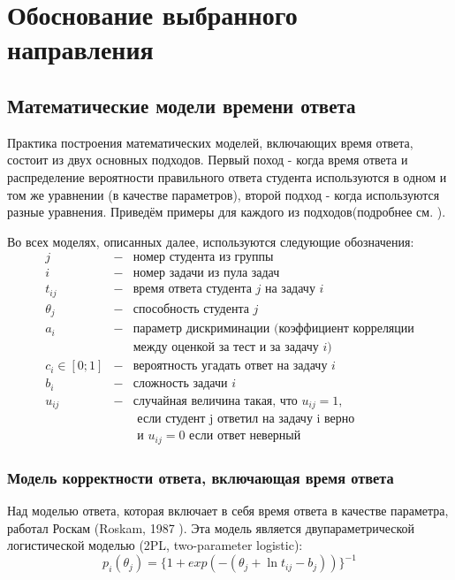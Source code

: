 \section{Обоснование выбранного направления}
\label{ch22}
\subsection{Математические модели времени ответа}

Практика построения математических моделей, включающих время от\-вета, состоит из двух основных подходов. Первый поход - когда время ответа и распределение вероятности правильного ответа студента используются в одном и том же уравнении (в качестве параметров), второй подход - когда используются разные урав\-нения. Приведём примеры для каждого из под\-ходов(подробнее см. \cite{8.}).

Во всех моделях, описанных далее, используются следующие обозначения:
$$
\begin{array}{lll}
j &-& \mbox{номер студента из группы}\\
i &-& \mbox{номер задачи из пула задач}\\
t_{ij} &-& \mbox{время ответа студента } j \mbox{ на задачу } i\\
\theta_j &-& \mbox{способность студента }j\\
a_i &-& \mbox{параметр дискриминации (коэффициент корреляции}\\
 & & \mbox{между оценкой за тест и за задачу } i)\\
c_i \in [0;1] &-& \mbox{вероятность угадать ответ на задачу } i\\
b_i &-& \mbox{сложность задачи } i\\
u_{ij} &-& \mbox{случайная величина такая, что } u_{ij} = 1, \\  
& &\mbox{ если студент  j  ответил на задачу i верно} \\
& &\mbox{ и }u_{ij} =0\mbox{ если ответ неверный} 
\end{array}
$$

\subsubsection{Модель корректности ответа, включающая время ответа}

Над моделью ответа, которая включает в себя время ответа в качест\-ве параметра, работал Роскам (Roskam, 1987 \cite{35.}). Эта модель является двупа\-раметрической логистической моделью (2PL, two-para\-meter logistic):
\begin{equation}
p_i(\theta_j) = \{1+exp(-(\theta_j + \ln t_{ij} - b_j))\}^{-1}
\end{equation}

